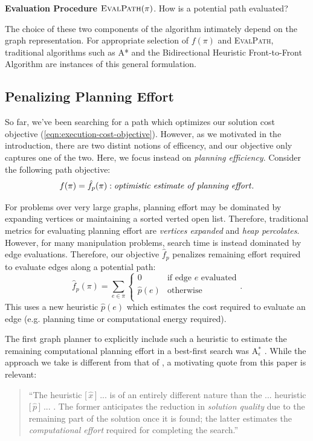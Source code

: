 \textbf{Evaluation Procedure $\mbox{\sc EvalPath}(\pi)$}.
How is a potential path evaluated?

The choice of these two components of the algorithm
intimately depend on the graph representation.
For appropriate selection
of $f(\pi)$ and \textsc{EvalPath},
traditional algorithms such as A* \cite{hart1968astar}
and the Bidirectional Heuristic Front-to-Front Algorithm
\cite{sint1977bhffa}
are instances of this general formulation.

\subsection{Penalizing Planning Effort}

So far, we've been searching for a path which optimizes our solution
cost objective (\ref{eqn:execution-cost-objective}).
However, as we motivated in the introduction,
there are two distint notions of efficency,
and our objective only captures one of the two.
Here, we focus instead on \emph{planning efficiency}.
Consider the following path objective:
\begin{equation}
   f(\pi) = \hat{f}_p(\pi) : \mbox{\emph{optimistic estimate of planning effort}}.
\end{equation}

For problems over very large graphs,
planning effort may be dominated by expanding vertices
or maintaining a sorted verted open list.
Therefore, traditional metrics for evaluating planning
effort are \emph{vertices expanded}
and \emph{heap percolates}.
However, for many manipulation problems,
search time is instead dominated by edge evaluations.
Therefore, our objective $\hat{f}_p$
penalizes remaining effort required to evaluate edges
along a potential path:
\begin{equation}
   \hat{f}_p(\pi) = \sum_{e \in \pi} \left\{
   \begin{array}{cl}
      0 & \mbox{if edge } e \mbox{ evaluated}  \\
      \hat{p}(e) & \mbox{otherwise} \\
   \end{array}
   \right.
   .
\end{equation}
This uses a new heuristic $\hat{p}(e)$ which estimates the cost
required to evaluate an edge
(e.g. planning time or computational energy required).

The first graph planner to explicitly include such a heuristic
to estimate the remaining
computational planning effort in a best-first search
was A$_\epsilon^*$ \cite{pearl1982semiadmissible}.
While the approach we take is different from that of
\cite{pearl1982semiadmissible},
a motivating quote from this paper is relevant:
\begin{quote}
``The heuristic [\,$\hat{x}$\,] ... is of an entirely
different nature than the ... heuristic [\,$\hat{p}$\,] ... .
The former anticipates the reduction in \emph{solution quality} due to the
remaining part of the solution once it is found;
the latter estimates the \emph{computational effort}
required for completing the search.''
\end{quote}

